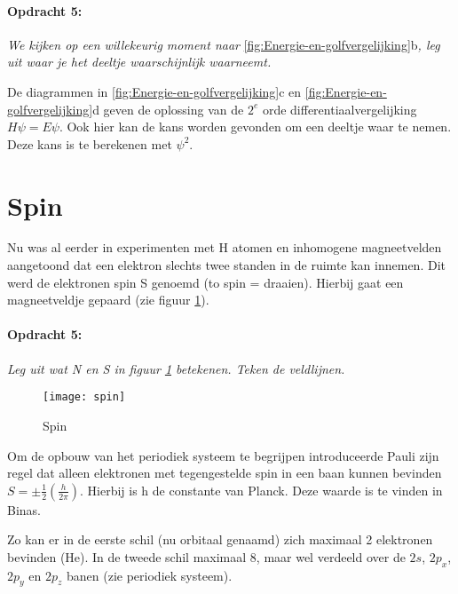 \paragraph*{Opdracht 5:}

\emph{We kijken op een willekeurig moment naar }\ref{fig:Energie-en-golfvergelijking}b\emph{,
leg uit waar je het deeltje waarschijnlijk waarneemt.}

De diagrammen in \ref{fig:Energie-en-golfvergelijking}c en \ref{fig:Energie-en-golfvergelijking}d
geven de oplossing van de $2^{e}$ orde differentiaalvergelijking
$H\psi=E\psi$. Ook hier kan de kans worden gevonden om een deeltje
waar te nemen. Deze kans is te berekenen met $\psi^{2}$.


\section{Spin}

Nu was al eerder in experimenten met H atomen en inhomogene magneetvelden
aangetoond dat een elektron slechts twee standen in de ruimte kan
innemen. Dit werd de elektronen spin S genoemd (to spin = draaien).
Hierbij gaat een magneetveldje gepaard (zie figuur \ref{fig:Spin}).


\paragraph*{Opdracht 5: }

\emph{Leg uit wat N en S in figuur \ref{fig:Spin} betekenen. Teken
de veldlijnen.}

\begin{figure}[h]
\noindent \begin{centering}
\texttt{[image: spin]}
\par\end{centering}

\caption{\label{fig:Spin}Spin}
\end{figure}


Om de opbouw van het periodiek systeem te begrijpen introduceerde
Pauli zijn regel dat alleen elektronen met tegengestelde spin in een
baan kunnen bevinden $S=\pm\frac{1}{2}(\frac{h}{2\pi})$. Hierbij
is h de constante van Planck. Deze waarde is te vinden in Binas.

Zo kan er in de eerste schil (nu orbitaal genaamd) zich maximaal 2
elektronen bevinden (He). In de tweede schil maximaal 8, maar wel
verdeeld over de $2s$, $2p_{x}$, $2p_{y}$ en $2p_{z}$ banen (zie
periodiek systeem).

